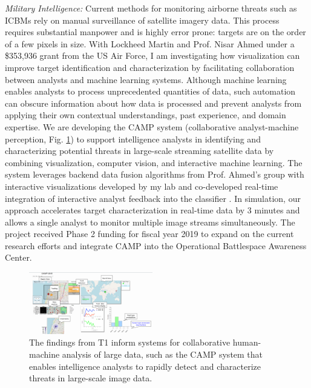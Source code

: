 \documentclass[11pt]{article}
\begin{document}
\emph{Military Intelligence:} Current methods for monitoring airborne threats such as ICBMs rely on manual surveillance of satellite imagery data. This process requires substantial manpower and is highly error prone: targets are on the order of a few pixels in size. With Lockheed Martin and Prof. Nisar Ahmed under a \$353,936 grant from the US Air Force, I am investigating how visualization can improve target identification and characterization
by facilitating collaboration between analysts and machine learning systems. Although machine learning enables analysts to process unprecedented quantities of data, such automation can obscure information about how data is processed and prevent analysts from applying their own contextual understandings, past experience, and domain expertise. 
We are developing the CAMP system (collaborative analyst-machine perception, Fig. \ref{interface}) to support intelligence analysts in identifying and characterizing potential threats in large-scale streaming satellite data by combining visualization, computer vision, and interactive machine learning. The system leverages backend data fusion algorithms from Prof. Ahmed's group with interactive visualizations developed by my lab and co-developed real-time integration of interactive analyst feedback into the classifier \cite{muesing2019}. In simulation, our approach accelerates target characterization in real-time data by 3 minutes and allows a single analyst to monitor multiple image streams simultaneously. The project received Phase 2 funding for fiscal year 2019 to expand on the current research efforts and integrate CAMP into the Operational Battlespace Awareness Center. 

\begin{figure}
	\begin{center}
		\includegraphics[width=0.48\textwidth]{interface}
	\end{center}
	\caption{The findings from T1 inform systems for collaborative human-machine analysis of large data, such as the CAMP system that enables intelligence analysts to rapidly detect and characterize threats in large-scale image data.}\label{interface}
\end{figure}
\end{document}
